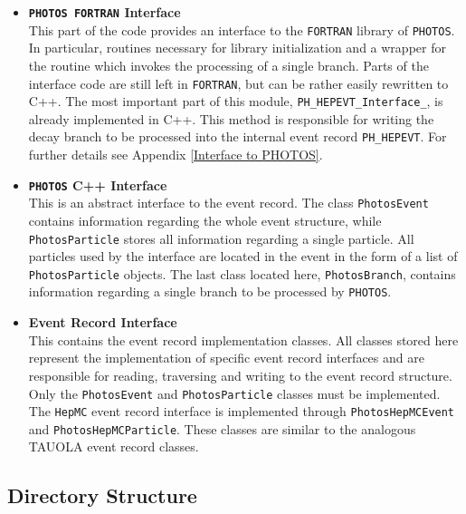\documentclass[]{Photos_interface_design}
\begin{document}
\begin{itemize}
  \item {\bf {\tt PHOTOS FORTRAN} Interface}\\
       This part of the code provides an interface 
       to the {\tt FORTRAN} library of {\tt PHOTOS}. In particular,  routines
       necessary for library initialization and a wrapper for the routine which invokes the processing
	   of a single branch. Parts of the interface code are still left in {\tt FORTRAN}, but
	   can be rather easily rewritten to C++. 
       The most important part of this module, {\tt PH\_HEPEVT\_Interface\_},
       is already implemented  in C++. This method is responsible for writing
	  the decay branch to be processed into the internal event record {\tt PH\_HEPEVT}.
       For further details see Appendix \ref{Interface to PHOTOS}.
  \item {\bf {\tt PHOTOS} C++ Interface} \\
       This is an abstract interface to the event record.
       The class {\tt PhotosEvent} contains information regarding the whole event
       structure, while {\tt PhotosParticle} stores all information regarding a single particle.
       All particles used by the interface are located in the event in the form of
       a list of {\tt PhotosParticle} objects.
       The last class located here, {\tt PhotosBranch}, contains information regarding
	 a  single branch to be processed by {\tt PHOTOS}.
  \item {\bf Event Record Interface} \\
       This contains the event record implementation classes. All classes stored here represent
       the implementation of specific event record interfaces and are responsible for reading,
       traversing and writing to the event record structure.
       Only the {\tt PhotosEvent} and {\tt PhotosParticle} classes must be implemented.
       The {\tt HepMC} event record interface is implemented
       through {\tt PhotosHepMCEvent} and {\tt PhotosHepMCParticle}. These classes are similar to the
       analogous TAUOLA event record classes.
\end{itemize}

\subsection{Directory Structure}
\end{document}
